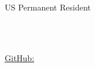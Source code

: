 \begin{center}
	\begin{minipage}[b]{.3\textwidth}
	\raggedright
	{\large \phone} \\ %
	{\city} \\ %
        US Permanent Resident\\
	\end{minipage}%
	\begin{minipage}[b]{.4\textwidth}
	\makeatletter
	\centering {\huge \@author} \\
	\makeatother
    \vspace{.7em}
    {\Large{\role}}
	\end{minipage}%
	\begin{minipage}[b]{.3\textwidth}
	\raggedleft 
	\href{mailto:\email}{\email} %
    \\
	\raggedleft 
	\href{https://github.com/youzhiw}{GitHub: \github} \\%
	\href{https://www.linkedin.com/in/youzhi-wang/}{\LinkedIn} %
	\end{minipage}

\end{center}
